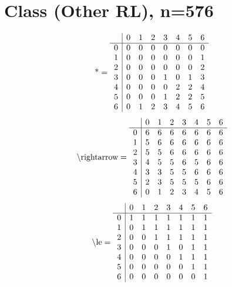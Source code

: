 \documentclass[11pt]{article}
\begin{document}
\section{Class (Other RL), n=576}
\[\text{*} = 
\begin{array}{r | r r r r r r r}
 & 0 & 1 & 2 & 3 & 4 & 5 & 6 \\ \hline
0 & 0 & 0 & 0 & 0 & 0 & 0 & 0 \\
1 & 0 & 0 & 0 & 0 & 0 & 0 & 1 \\
2 & 0 & 0 & 0 & 0 & 0 & 0 & 2 \\
3 & 0 & 0 & 0 & 1 & 0 & 1 & 3 \\
4 & 0 & 0 & 0 & 0 & 2 & 2 & 4 \\
5 & 0 & 0 & 0 & 1 & 2 & 2 & 5 \\
6 & 0 & 1 & 2 & 3 & 4 & 5 & 6 \\
\end{array}
\]
\[\text{\textbackslash rightarrow} = 
\begin{array}{r | r r r r r r r}
 & 0 & 1 & 2 & 3 & 4 & 5 & 6 \\ \hline
0 & 6 & 6 & 6 & 6 & 6 & 6 & 6 \\
1 & 5 & 6 & 6 & 6 & 6 & 6 & 6 \\
2 & 5 & 5 & 6 & 6 & 6 & 6 & 6 \\
3 & 4 & 5 & 5 & 6 & 5 & 6 & 6 \\
4 & 3 & 3 & 5 & 5 & 6 & 6 & 6 \\
5 & 2 & 3 & 5 & 5 & 5 & 6 & 6 \\
6 & 0 & 1 & 2 & 3 & 4 & 5 & 6 \\
\end{array}
\]
\[\text{\textbackslash le} = 
\begin{array}{r | r r r r r r r}
 & 0 & 1 & 2 & 3 & 4 & 5 & 6 \\ \hline
0 & 1 & 1 & 1 & 1 & 1 & 1 & 1 \\
1 & 0 & 1 & 1 & 1 & 1 & 1 & 1 \\
2 & 0 & 0 & 1 & 1 & 1 & 1 & 1 \\
3 & 0 & 0 & 0 & 1 & 0 & 1 & 1 \\
4 & 0 & 0 & 0 & 0 & 1 & 1 & 1 \\
5 & 0 & 0 & 0 & 0 & 0 & 1 & 1 \\
6 & 0 & 0 & 0 & 0 & 0 & 0 & 1 \\
\end{array}
\]
\end{document}
